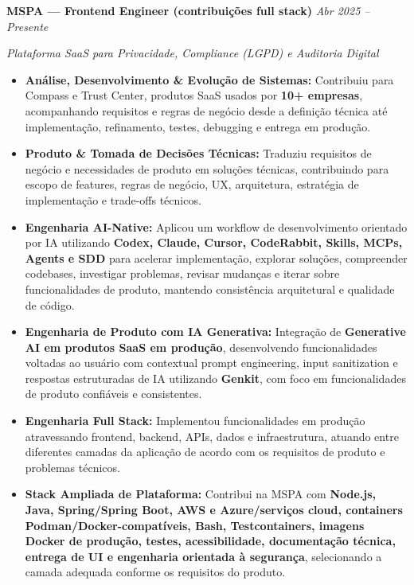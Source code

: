 \documentclass[10pt,a4paper]{article}
\begin{document}
\noindent
\textbf{MSPA — Frontend Engineer (contribuições full stack)}
\hfill
\textit{Abr 2025 -- Presente}

\textit{Plataforma SaaS para Privacidade, Compliance (LGPD) e Auditoria Digital}

\begin{itemize}

    \item
    \textbf{Análise, Desenvolvimento \& Evolução de Sistemas:}
    Contribuiu para Compass e Trust Center, produtos SaaS usados
    por \textbf{10+ empresas}, acompanhando requisitos e regras de
    negócio desde a definição técnica até implementação,
    refinamento, testes, debugging e entrega em produção.

    \item
    \textbf{Produto \& Tomada de Decisões Técnicas:}
    Traduziu requisitos de negócio e necessidades de produto em
    soluções técnicas, contribuindo para escopo de features,
    regras de negócio, UX, arquitetura, estratégia de
    implementação e trade-offs técnicos.

    \item
    \textbf{Engenharia AI-Native:}
    Aplicou um workflow de desenvolvimento orientado por IA
    utilizando \textbf{Codex, Claude, Cursor, CodeRabbit, Skills,
    MCPs, Agents e SDD} para acelerar implementação, explorar
    soluções, compreender codebases, investigar problemas,
    revisar mudanças e iterar sobre funcionalidades de produto,
    mantendo consistência arquitetural e qualidade de código.

    \item
    \textbf{Engenharia de Produto com IA Generativa:}
    Integração de \textbf{Generative AI em produtos SaaS em
    produção}, desenvolvendo funcionalidades voltadas ao usuário
    com contextual prompt engineering, input sanitization e
    respostas estruturadas de IA utilizando \textbf{Genkit},
    com foco em funcionalidades de produto confiáveis e
    consistentes.

    \item
    \textbf{Engenharia Full Stack:}
    Implementou funcionalidades em produção atravessando
    frontend, backend, APIs, dados e infraestrutura, atuando
    entre diferentes camadas da aplicação de acordo com os
    requisitos de produto e problemas técnicos.

    \item
    \textbf{Stack Ampliada de Plataforma:}
    Contribui na MSPA com \textbf{Node.js, Java, Spring/Spring Boot,
    AWS e Azure/serviços cloud, containers Podman/Docker-compatíveis,
    Bash, Testcontainers, imagens Docker de produção, testes, acessibilidade,
    documentação técnica, entrega de UI e engenharia orientada à segurança},
    selecionando a camada adequada conforme os requisitos do produto.


\end{itemize}
\end{document}
